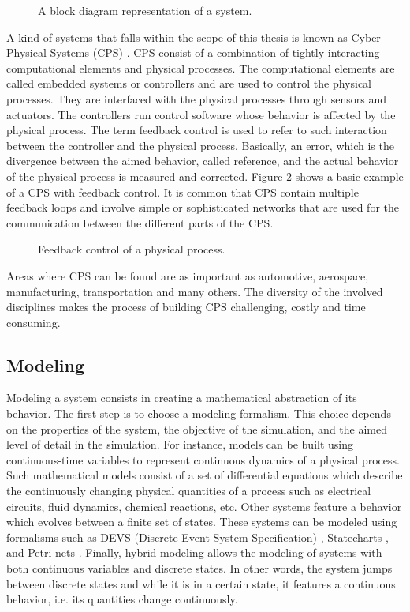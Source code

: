 \begin{figure}[phbt]
\centering

\caption{A block diagram representation of a system.}
\label{fig:system}
\end{figure}

A kind of systems that falls within the scope of this thesis is known as Cyber-Physical Systems (CPS) \cite{lee:2016}. CPS consist of a combination of tightly interacting computational elements and physical processes. The computational elements are called embedded systems or controllers and are used to control the physical processes. They are interfaced with the physical processes through sensors and actuators. The controllers run control software whose behavior is affected by the physical process. The term feedback control is used to refer to such interaction between the controller and the physical process. Basically, an error, which is the divergence between the aimed behavior, called reference, and the actual behavior of the physical process is measured and corrected. Figure \ref{fig:feedb} shows a basic example of a CPS with feedback control. It is common that CPS contain multiple feedback loops and involve simple or sophisticated networks that are used for the communication between the different parts of the CPS.

\begin{figure}[phbt]
\centering

\caption{Feedback control of a physical process.}
\label{fig:feedb}
\end{figure}  

Areas where CPS can be found are as important as automotive, aerospace, manufacturing, transportation and many others. The diversity of the involved disciplines makes the process of building CPS challenging, costly and time consuming.

\subsection{Modeling}

Modeling a system consists in creating a mathematical abstraction of its behavior. The first step is to choose a modeling formalism. This choice depends on the properties of the system, the objective of the simulation, and the aimed level of detail in the simulation. For instance, models can be built using continuous-time variables to represent continuous dynamics of a physical process. Such mathematical models consist of a set of differential equations which describe the continuously changing physical quantities of a process such as electrical circuits, fluid dynamics, chemical reactions, etc. Other systems feature a behavior which evolves between a finite set of states. These systems can be modeled using formalisms such as DEVS (Discrete Event System Specification) \cite{zeigler:2000}, Statecharts \cite{harel:1987}, and Petri nets \cite{petri:1962}. Finally, hybrid modeling allows the modeling of systems with both continuous variables and discrete states. In other words, the system jumps between discrete states and while it is in a certain state, it features a continuous behavior, i.e. its quantities change continuously. 

